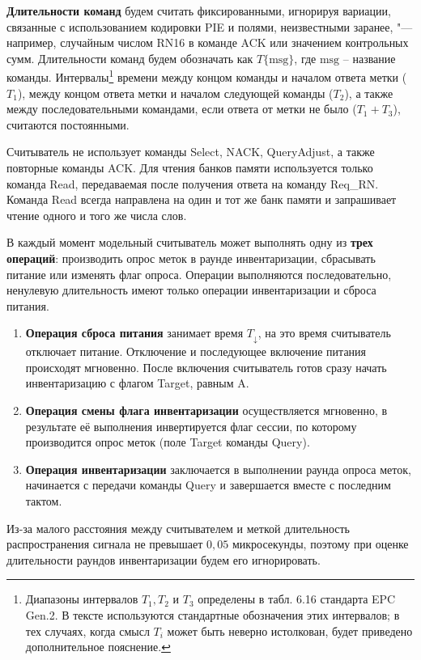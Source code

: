 \textbf{Длительности команд} будем считать фиксированными, игнорируя вариации, связанные с использованием кодировки PIE и полями, неизвестными заранее, "--- например, случайным числом RN16 в команде ACK или значением контрольных сумм. Длительности команд будем обозначать как $T\{\text{msg}\}$, где $\text{msg}$ -- название команды. Интервалы\footnote{Диапазоны интервалов $T_1, T_2 \text{ и } T_3$ определены в табл. 6.16 стандарта EPC Gen.2. В тексте используются стандартные обозначения этих интервалов; в тех случаях, когда смысл $T_i$ может быть неверно истолкован, будет приведено дополнительное пояснение.} времени между концом команды и началом ответа метки ($T_1$), между концом ответа метки и началом следующей команды ($T_2$), а также между последовательными командами, если ответа от метки не было ($T_1 + T_3$), считаются постоянными.

Считыватель не использует команды Select, NACK, QueryAdjust, а также повторные команды ACK. Для чтения банков памяти используется только команда Read, передаваемая после получения ответа на команду Req\_RN. Команда Read всегда направлена на один и тот же банк памяти и запрашивает чтение одного и того же числа слов.

В каждый момент модельный считыватель может выполнять одну из \textbf{трех операций}: производить опрос меток в раунде инвентаризации, сбрасывать питание или изменять флаг опроса. Операции выполняются последовательно, ненулевую длительность имеют только операции инвентаризации и сброса питания.

\begin{enumerate}
	\item \textbf{Операция сброса питания} занимает время $T_\downarrow$, на это время считыватель отключает питание. Отключение и последующее включение питания происходят мгновенно. После включения считыватель готов сразу начать инвентаризацию с флагом Target, равным A.

	\item \textbf{Операция смены флага инвентаризации} осуществляется мгновенно, в результате её выполнения инвертируется флаг сессии, по которому производится опрос меток (поле Target команды Query).

	\item \textbf{Операция инвентаризации} заключается в выполнении раунда опроса меток, начинается с передачи команды Query и завершается вместе с последним тактом.
\end{enumerate}

Из-за малого расстояния между считывателем и меткой длительность распространения сигнала не превышает $0,05$ микросекунды, поэтому при оценке длительности раундов инвентаризации будем его игнорировать.


